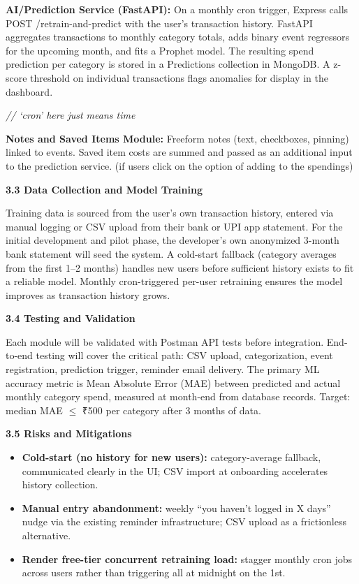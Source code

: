 \documentclass[12pt,a4paper]{article}\ref{}
\newcommand{\subsectiontitle}[1]{%
    \vspace{5pt}
    \textbf{#1}
    \vspace{3pt}
}
\begin{document}
\textbf{AI/Prediction Service (FastAPI):} On a monthly cron trigger, Express calls
POST /retrain-and-predict with the user's transaction history. FastAPI aggregates
transactions to monthly category totals, adds binary event regressors for the upcoming
month, and fits a Prophet model. The resulting spend prediction per category is stored
in a Predictions collection in MongoDB. A z-score threshold on individual transactions
flags anomalies for display in the dashboard.

\textit{// `cron' here just means time}

\textbf{Notes and Saved Items Module:} Freeform notes (text, checkboxes, pinning) linked to
events. Saved item costs are summed and passed as an additional input to the prediction
service. (if users click on the option of adding to the spendings)

\subsectiontitle{3.3 Data Collection and Model Training}

Training data is sourced from the user's own transaction history, entered via manual
logging or CSV upload from their bank or UPI app statement. For the initial development
and pilot phase, the developer's own anonymized 3-month bank statement will seed the
system. A cold-start fallback (category averages from the first 1--2 months) handles new
users before sufficient history exists to fit a reliable model. Monthly cron-triggered
per-user retraining ensures the model improves as transaction history grows.

\subsectiontitle{3.4 Testing and Validation}

Each module will be validated with Postman API tests before integration. End-to-end
testing will cover the critical path: CSV upload, categorization, event registration,
prediction trigger, reminder email delivery. The primary ML accuracy metric is Mean
Absolute Error (MAE) between predicted and actual monthly category spend, measured
at month-end from database records. Target: median MAE $\leq$ ₹500 per category after
3 months of data.

\subsectiontitle{3.5 Risks and Mitigations}

\begin{itemize}[leftmargin=1.5em]
    \item \textbf{Cold-start (no history for new users):} category-average fallback,
    communicated clearly in the UI; CSV import at onboarding accelerates history
    collection.

    \item \textbf{Manual entry abandonment:} weekly ``you haven't logged in X days''
    nudge via the existing reminder infrastructure; CSV upload as a frictionless
    alternative.

    \item \textbf{Render free-tier concurrent retraining load:} stagger monthly cron
    jobs across users rather than triggering all at midnight on the 1st.
\end{itemize}
\end{document}
